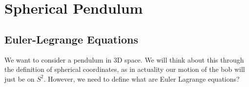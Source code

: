
\section{Spherical Pendulum}

\subsection{Euler-Legrange Equations}

We want to consider a pendulum in 3D space. We will think about this through the definition of spherical coordinates, as in actuality our motion of the bob will just be on $S^2$. However, we need to define what are Euler Lagrange equations?\cite{holm_2011}\\

